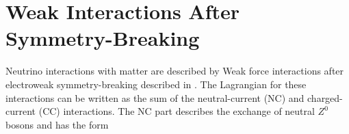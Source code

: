 
%
%

\section{Weak Interactions After Symmetry-Breaking}
\label{sec:ew-interactions}

Neutrino interactions with matter are described by Weak force interactions after electroweak symmetry-breaking described in .
The Lagrangian for these interactions can be written as the sum of the neutral-current (NC) and charged-current (CC) interactions. The NC part describes the exchange of neutral $Z^0$ bosons and has the form

